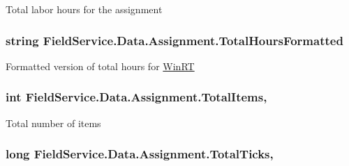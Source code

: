 Total labor hours for the assignment 

\hypertarget{class_field_service_1_1_data_1_1_assignment_ae016207c39635002331756b6083dd5bf}{
\subsubsection[{Total\+Hours\+Formatted}]{\setlength{\rightskip}{0pt plus 5cm}string Field\+Service.\+Data.\+Assignment.\+Total\+Hours\+Formatted\hspace{0.3cm}{\ttfamily [get]}}}\label{class_field_service_1_1_data_1_1_assignment_ae016207c39635002331756b6083dd5bf}


Formatted version of total hours for \hyperlink{namespace_field_service_1_1_win_r_t}{Win\+R\+T} 

\hypertarget{class_field_service_1_1_data_1_1_assignment_a1ebc0bb4efb6e07b750625f5f0275e02}{
\subsubsection[{Total\+Items}]{\setlength{\rightskip}{0pt plus 5cm}int Field\+Service.\+Data.\+Assignment.\+Total\+Items\hspace{0.3cm}{\ttfamily [get]}, {\ttfamily [set]}}}\label{class_field_service_1_1_data_1_1_assignment_a1ebc0bb4efb6e07b750625f5f0275e02}


Total number of items 

\hypertarget{class_field_service_1_1_data_1_1_assignment_a98568ec9c68653fd325f7088c1515565}{
\subsubsection[{Total\+Ticks}]{\setlength{\rightskip}{0pt plus 5cm}long Field\+Service.\+Data.\+Assignment.\+Total\+Ticks\hspace{0.3cm}{\ttfamily [get]}, {\ttfamily [set]}}}\label{class_field_service_1_1_data_1_1_assignment_a98568ec9c68653fd325f7088c1515565}



